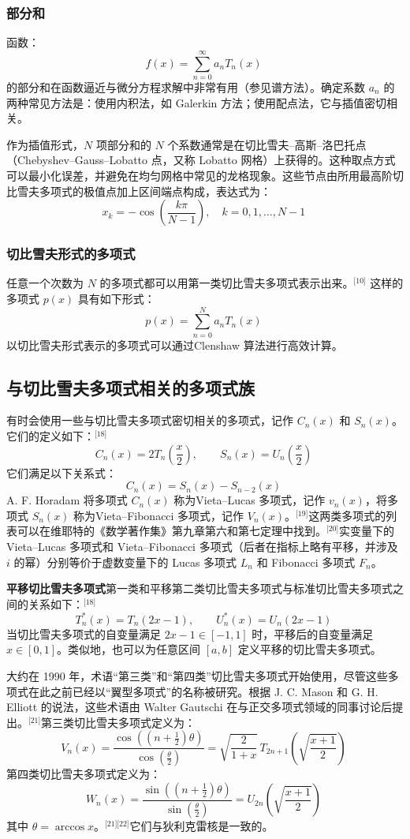 \subsubsection{部分和}
函数：
$$
f(x) = \sum_{n=0}^{\infty} a_n T_n(x)~
$$
的部分和在函数逼近与微分方程求解中非常有用（参见谱方法）。确定系数 $a_n$ 的两种常见方法是：使用内积法，如 Galerkin 方法；使用配点法，它与插值密切相关。

作为插值形式，$N$ 项部分和的 $N$ 个系数通常是在切比雪夫–高斯–洛巴托点（Chebyshev–Gauss–Lobatto 点，又称 Lobatto 网格）上获得的。这种取点方式可以最小化误差，并避免在均匀网格中常见的龙格现象。这些节点由所用最高阶切比雪夫多项式的极值点加上区间端点构成，表达式为：
$$
x_k = -\cos\left( \frac{k\pi}{N - 1} \right),\quad k = 0, 1, \dots, N - 1~
$$
\subsubsection{切比雪夫形式的多项式}
任意一个次数为 $N$ 的多项式都可以用第一类切比雪夫多项式表示出来。\(^\text{[10]}\)
这样的多项式 $p(x)$ 具有如下形式：
$$
p(x) = \sum_{n=0}^{N} a_n T_n(x)~
$$
以切比雪夫形式表示的多项式可以通过Clenshaw 算法进行高效计算。
\subsection{与切比雪夫多项式相关的多项式族}
有时会使用一些与切比雪夫多项式密切相关的多项式，记作 $C_n(x)$ 和 $S_n(x)$。它们的定义如下：\(^\text{[18]}\)
$$
C_n(x) = 2T_n\left(\frac{x}{2}\right), \qquad S_n(x) = U_n\left(\frac{x}{2}\right)~
$$
它们满足以下关系式：
$$
C_n(x) = S_n(x) - S_{n-2}(x)~
$$
A. F. Horadam 将多项式 $C_n(x)$ 称为Vieta–Lucas 多项式，记作 $v_n(x)$，将多项式 $S_n(x)$ 称为Vieta–Fibonacci 多项式，记作 $V_n(x)$。\(^\text{[19]}\)这两类多项式的列表可以在维耶特的《数学著作集》第九章第六和第七定理中找到。\(^\text{[20]}\)实变量下的 Vieta–Lucas 多项式和 Vieta–Fibonacci 多项式（后者在指标上略有平移，并涉及 $i$ 的幂）分别等价于虚数变量下的 Lucas 多项式 $L_n$ 和 Fibonacci 多项式 $F_n$。

\textbf{平移切比雪夫多项式}第一类和平移第二类切比雪夫多项式与标准切比雪夫多项式之间的关系如下：\(^\text{[18]}\)
$$
T_n^*(x) = T_n(2x - 1),\qquad U_n^*(x) = U_n(2x - 1)~
$$
当切比雪夫多项式的自变量满足 $2x - 1 \in [-1, 1]$ 时，平移后的自变量满足 $x \in [0, 1]$。类似地，也可以为任意区间 $[a, b]$ 定义平移的切比雪夫多项式。

大约在 1990 年，术语“第三类”和“第四类”切比雪夫多项式开始使用，尽管这些多项式在此之前已经以“翼型多项式”的名称被研究。根据 J. C. Mason 和 G. H. Elliott 的说法，这些术语由 Walter Gautschi 在与正交多项式领域的同事讨论后提出。\(^\text{[21]}\)第三类切比雪夫多项式定义为：
$$
V_n(x) = \frac{\cos\left(\left(n + \tfrac{1}{2}\right)\theta\right)}{\cos\left(\tfrac{\theta}{2}\right)} = \sqrt{\frac{2}{1 + x}}\, T_{2n+1}\left(\sqrt{\frac{x + 1}{2}}\right)~
$$
第四类切比雪夫多项式定义为：
$$
W_n(x) = \frac{\sin\left(\left(n + \tfrac{1}{2}\right)\theta\right)}{\sin\left(\tfrac{\theta}{2}\right)} = U_{2n}\left(\sqrt{\frac{x + 1}{2}}\right)~
$$
其中 $\theta = \arccos x$。\(^\text{[21][22]}\)它们与狄利克雷核是一致的。


